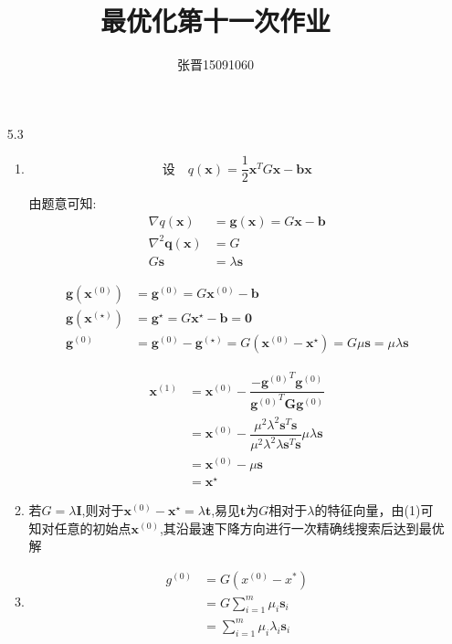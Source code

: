 \documentclass[UTF8]{ctexart}
\title{\heiti 最优化第十一次作业}
\author{\kaishu 张晋15091060}
\begin{document}
\maketitle
\begin{enumerate}
\item[5.3]
\begin{enumerate}
\item 
\begin{equation}
\text{设}\quad q(\bm{x})=\dfrac{1}{2}\bm{x}^TG\bm{x}-\bm{b}\bm{x}
\end{equation}

由题意可知:
\begin{align}
\nabla q( \bm{x}) &=\bm{g}(\bm{x}) =G\bm{x}-\bm{b}\\
\nabla^{2}\bm{q}\left( \bm{x}\right)&=G\\
G\bm{s}&=\lambda \bm{s}
\end{align}



\begin{align}
\bm{g}(\bm{x}^{(0)})&=\bm{g}^{(0)}=G\bm{x}^{(0)}-\bm{b}\\
\bm{g}(\bm{x}^{(\star)})&=\bm{g}^{\star}=G\bm{x}^{\star}-\bm{b}=\bm{0}\\
\bm{g}^{(0)}&=\bm{g}^{(0)}-\bm{g}^{(\star)}=G(\bm{x}^{(0)}-\bm{x}^{\star})=G\mu\bm{s}=\mu\lambda\bm{s}
\end{align}


\begin{align}
\bm{x}^{(1)}&=\bm{x}^{(0)}-\dfrac{{-{\bm{g}^{(0)}}^T}\bm{g}^{(0)}}{{\bm{g}^{(0)}}^T\bm{G}\bm{g}^{(0)}}\\
&=\bm{x}^{(0)}-\dfrac {\mu^{2}\lambda^{2}\bm{s}^{T}\bm{s}}{\mu^{2}\lambda^{2}\lambda \bm{s}^{T}\bm{s}}\mu\lambda\bm{s}\\
&=\bm{x}^{(0)}-\mu\bm{s}\\
&=\bm{x}^{\star}
\end{align}

\item 
若$G=\lambda \bm{I}$,则对于$\bm{x}^{(0)}-\bm{x}^{\star}=\lambda \bm{t}$,易见$\bm{t}$为$G$相对于$\lambda $的特征向量，由(1)可知对任意的初始点$\bm{x}^{(0)}$,其沿最速下降方向进行一次精确线搜索后达到最优解

\item 
\begin{align}
g^{(0)}&=G\left( x^{(0)}-x^{\ast }\right)\\
&=G\sum ^{m}_{i=1}\mu _{i}\bm{s}_{i}\\
&=\sum ^{m}_{i=1}\mu _{i}\lambda _{i}\bm{s}_{i}
\end{align}



\end{enumerate}
\end{enumerate}
\end{document}
